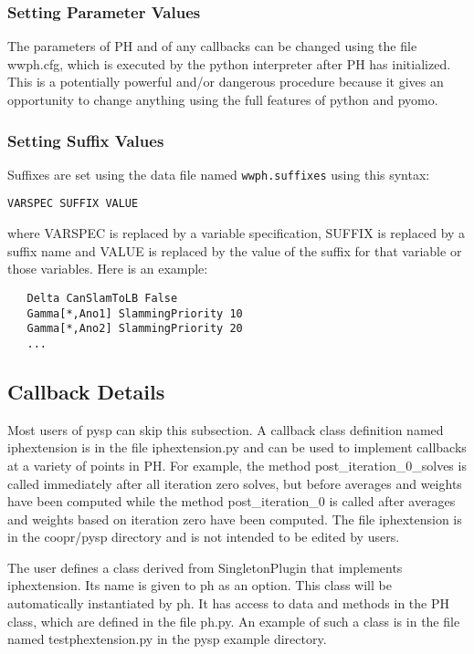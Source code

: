 \subsubsection{Setting Parameter Values \label{ParmSec}}

The parameters of PH and of any callbacks can be changed using the file wwph.cfg, which is executed by the python interpreter after PH has initialized. This is 
a potentially powerful and/or dangerous procedure because it gives an opportunity
to change anything using the full features of python and pyomo.

\subsubsection{Setting Suffix Values \label{SuffixSec}}

Suffixes are set using the data file named \verb|wwph.suffixes| using this syntax:

\begin{verbatim}
VARSPEC SUFFIX VALUE
\end{verbatim}

where VARSPEC is replaced by a variable specification, SUFFIX is replaced by a suffix name and VALUE is replaced by the value of the suffix for
that variable or those variables. Here is an example:

\begin{verbatim}
   Delta CanSlamToLB False
   Gamma[*,Ano1] SlammingPriority 10
   Gamma[*,Ano2] SlammingPriority 20
   ...
\end{verbatim}


\subsection{Callback Details \label{ExtensionDetailsSec}}

Most users of pysp can skip this subsection.
A callback class definition named iphextension is in the file iphextension.py and can be used to implement callbacks at a 
variety of points in PH. For example, the method post\_iteration\_0\_solves is called immediately after all iteration zero
solves, but before averages and weights have been computed while the method post\_iteration\_0 is called after averages and 
weights based on iteration zero have been computed. The file iphextension is in the coopr/pysp directory and is not
intended to be edited by users.

The user defines a class derived from SingletonPlugin that implements iphextension. Its name is given to ph as an option. This class will be automatically instantiated by ph.
It has access to data and methods in the PH class, which are defined in the file ph.py. An example of such a class is in the
file named testphextension.py in the pysp example directory. 

